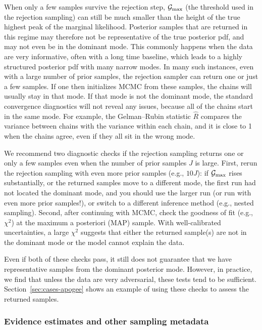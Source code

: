 \documentclass[twocolumn]{AASTeX7/aastex701}
\begin{document}
When only a few samples survive the rejection step, $\mathcal{G}_{\rm max}$ (the
threshold used in the rejection sampling) can still be much smaller than the height of
the true highest peak of the marginal likelihood.
Posterior samples that are returned in this regime may therefore not be representative
of the true posterior pdf, and may not even be in the dominant mode.
This commonly happens when the data are very informative, often with a long time
baseline, which leads to a highly structured posterior pdf with many narrow modes.
In many such instances, even with a large number of prior samples, the rejection
sampler can return one or just a few samples.
If one then initializes MCMC from these samples, the chains will usually stay in that
mode.
If that mode is not the dominant mode, the standard convergence diagnostics will not
reveal any issues, because all of the chains start in the same mode.
For example, the Gelman--Rubin statistic $\hat{R}$ \citep{Gelman:1992} compares the
variance between chains with the variance within each chain, and it is close to 1 when
the chains agree, even if they all sit in the wrong mode.

We recommend two diagnostic checks if the rejection sampling returns one or only a few
samples even when the number of prior samples $J$ is large.
First, rerun the rejection sampling with even more prior samples (e.g., $10J$): if
$\mathcal{G}_{\rm max}$ rises substantially, or the returned samples move to a different
mode, the first run had not located the dominant mode, and you should use the larger run
(or run with even more prior samples!), or switch to a different inference method (e.g.,
nested sampling).
Second, after continuing with MCMC, check the goodness of fit (e.g., $\chi^2$) at the
maximum a posteriori (MAP) sample.
With well-calibrated uncertainties, a large $\chi^2$ suggests that either the returned
sample(s) are not in the dominant mode or the model cannot explain the data.

Even if both of these checks pass, it still does not guarantee that we have
representative samples from the dominant posterior mode.
However, in practice, we find that unless the data are very adversarial, these
tests tend to be sufficient.
Section~\ref{sec:cases-apogee} shows an example of using these checks to assess the
returned samples.


\subsubsection{Evidence estimates and other sampling metadata}
\label{sec:methods-evidence}
\end{document}
